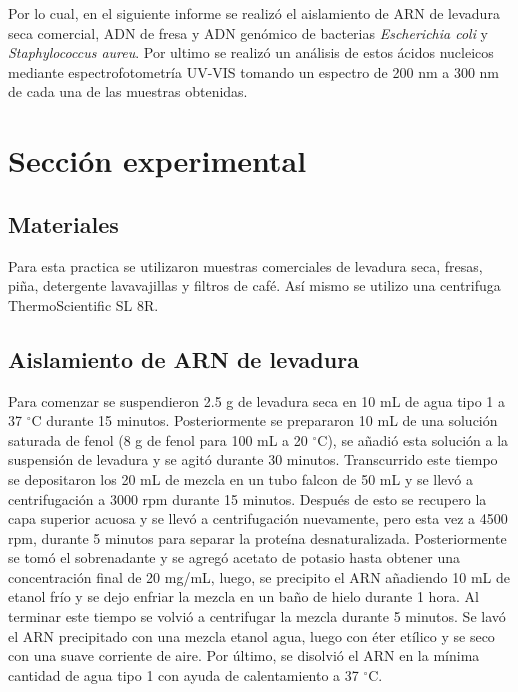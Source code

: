 \documentclass[fleqn,10pt]{SelfArx}
\begin{document}
	Por lo cual, en el siguiente informe se realizó el aislamiento de ARN de levadura seca comercial, ADN de fresa y ADN genómico de bacterias \textit{Escherichia coli} y \textit{Staphylococcus aureu}. Por ultimo se realizó un análisis de estos ácidos nucleicos mediante espectrofotometría UV-VIS tomando un espectro de 200 nm a 300 nm de cada una de las muestras obtenidas.
	
\section{Secci\'on experimental}
	\subsection{Materiales}
	Para esta practica se utilizaron muestras comerciales de levadura seca, fresas, piña, detergente lavavajillas y filtros de café. Así mismo se utilizo una centrifuga ThermoScientific SL 8R.
	
	\subsection{Aislamiento de ARN de levadura}
	Para comenzar se suspendieron 2.5 g de levadura seca en 10 mL de agua tipo 1 a 37 $^\circ$C durante 15 minutos. Posteriormente se prepararon 10 mL de una solución saturada de fenol (8 g de fenol para 100 mL a 20 $^\circ$C), se añadió esta solución a la suspensión de levadura y se agitó durante 30 minutos. Transcurrido este tiempo se depositaron los 20 mL de mezcla en un tubo falcon de 50 mL y se llevó a centrifugación a 3000 rpm durante 15 minutos. Después de esto se recupero la capa superior acuosa y se llevó a centrifugación nuevamente, pero esta vez a 4500 rpm, durante 5 minutos para separar la proteína desnaturalizada. Posteriormente se tomó el sobrenadante y se agregó acetato de potasio hasta obtener una concentración final de 20 mg/mL, luego, se precipito el ARN añadiendo 10 mL de etanol frío y se dejo enfriar la mezcla en un baño de hielo durante 1 hora. Al terminar este tiempo se volvió a centrifugar la mezcla durante 5 minutos. Se lavó el ARN precipitado con una mezcla etanol agua, luego con éter etílico y se seco con una suave corriente de aire. Por último, se disolvió el ARN en la mínima cantidad de agua tipo 1 con ayuda de calentamiento a 37 $^\circ$C.
	
\end{document}
